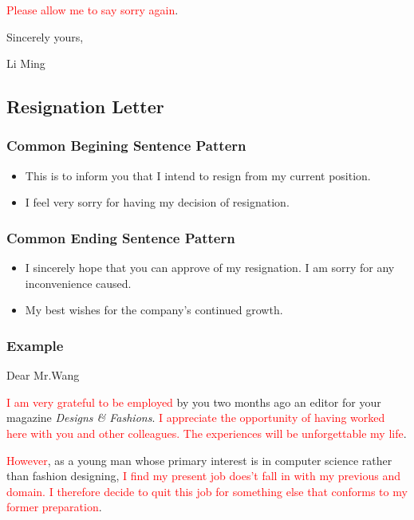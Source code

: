 \documentclass{article}
\begin{document}
\par \textcolor{red}{Please allow me to say sorry again}.

\hfill Sincerely yours,

\hfill Li Ming



\subsection{Resignation Letter}
\label{sec:letter}

\subsubsection{Common Begining Sentence Pattern}
\label{sec:comm-begnn-sent}
\begin{itemize}
\item This is to inform you that I intend to resign from my current position.
\item I feel very sorry for having my decision of resignation.
\end{itemize}

\subsubsection{Common Ending Sentence Pattern}
\label{sec:comm-ending-sent-2}
\begin{itemize}
\item I sincerely hope that you can approve of my resignation. I am sorry for any
  inconvenience caused.
\item My best wishes for the company's continued growth.
\end{itemize}

\subsubsection{Example}
\label{sec:example-2}
Dear Mr.Wang
\par \textcolor{red}{I am very grateful to be employed }by you two months ago an editor
for your magazine \emph {Designs \& Fashions}. \textcolor{red}{I appreciate the opportunity
of having worked here with you and other colleagues. The experiences will be
unforgettable my life}.

\par \textcolor{red}{However}, as a young man whose primary interest is in computer
science rather than fashion designing, \textcolor{red}{I find my present job does't fall
  in with my previous and domain. I therefore decide to quit this job for something else
  that conforms to my former preparation}.
\end{document}

